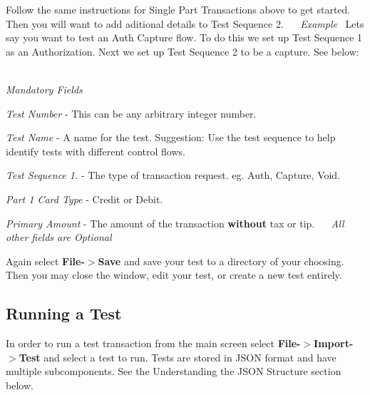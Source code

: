 Follow the same instructions for Single Part Transactions above to get started. Then you will want to add aditional details to Test Sequence 2.~\newline
 ~\newline
 {\itshape Example}~\newline
 Let\textquotesingle{}s say you want to test an Auth Capture flow. To do this we set up Test Sequence 1 as an Authorization. Next we set up Test Sequence 2 to be a capture. See below\+: ~\newline




{\itshape Mandatory Fields}~\newline

\begin{DoxyItemize}
\item {\itshape Test Number} -\/ This can be any arbitrary integer number.~\newline

\item {\itshape Test Name} -\/ A name for the test. Suggestion\+: Use the test sequence to help identify tests with different control flows.~\newline

\item {\itshape Test Sequence 1.} -\/ The type of transaction request. eg. Auth, Capture, Void.~\newline

\item {\itshape Part 1 Card Type} -\/ Credit or Debit.~\newline

\item {\itshape Primary Amount} -\/ The amount of the transaction {\bfseries without} tax or tip.~\newline
 ~\newline
 {\itshape All other fields are Optional}
\end{DoxyItemize}

Again select {\bfseries File-\/$>$Save} and save your test to a directory of your choosing. Then you may close the window, edit your test, or create a new test entirely.

\subsection*{Running a Test}

In order to run a test transaction from the main screen select {\bfseries File-\/$>$Import-\/$>$Test} and select a test to run. Tests are stored in J\+S\+ON format and have multiple subcomponents. See the Understanding the J\+S\+ON Structure section below.~\newline


